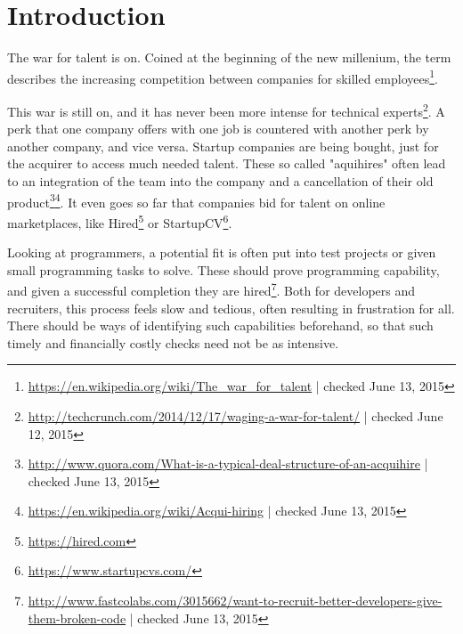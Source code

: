 \chapter{Introduction}\label{ch:introduction}
The war for talent is on. Coined at the beginning of the new
millenium, the term describes the increasing competition between companies
for skilled employees\footnote{\url{https://en.wikipedia.org/wiki/The_war_for_talent} | checked June 13, 2015}.

This war is still on, and it has never been more intense for technical experts\footnote{\url{http://techcrunch.com/2014/12/17/waging-a-war-for-talent/} | checked June 12, 2015}.
A perk that one company offers with one job is countered with another perk by
another company, and vice versa. Startup companies are being bought,
just for the acquirer to access much needed talent.
These so called "aquihires" often lead to an integration of the team into
the company and a cancellation of their old product\footnote{\url{http://www.quora.com/What-is-a-typical-deal-structure-of-an-acquihire} | checked June 13, 2015}\footnote{\url{https://en.wikipedia.org/wiki/Acqui-hiring} | checked June 13, 2015}.
It even goes so far that companies bid for talent on online marketplaces, like
Hired\footnote{\url{https://hired.com}} or StartupCV\footnote{\url{https://www.startupcvs.com/}}.
\newline

Looking at programmers, a potential fit is often put into
test projects or given small programming tasks to solve.
These should prove programming capability, and given a successful completion
they are hired\footnote{\url{http://www.fastcolabs.com/3015662/want-to-recruit-better-developers-give-them-broken-code} | checked June 13, 2015}.
Both for developers and recruiters, this process feels slow and tedious,
often resulting in frustration for all. There should be ways of
identifying such capabilities beforehand, so that such timely and financially
costly checks need not be as intensive.

